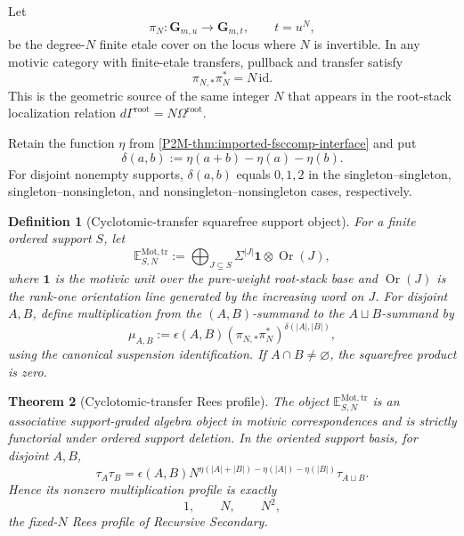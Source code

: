 \documentclass[11pt]{article}
\newtheorem{theorem}{Theorem}[section]
\newtheorem{definition}[theorem]{Definition}
\theoremstyle{remark}
\newcommand{\Mot}{\mathrm{Mot}}
\newcommand{\rootc}{\mathrm{root}}
\begin{document}
Let
\[
 \pi_N:\mathbf G_{m,u}\longrightarrow\mathbf G_{m,t},
 \qquad t=u^N,
\]
be the degree-\(N\) finite etale cover on the locus where \(N\) is invertible.
In any motivic category with finite-etale transfers, pullback and transfer
satisfy
\[
 \boxed{\pi_{N,*}\pi_N^*=N\,\mathrm{id}.}
\]
This is the geometric source of the same integer \(N\) that appears in the
root-stack localization relation \(d\Gamma^{\rootc}=N\Omega^{\rootc}\).

Retain the function \(\eta\) from
\cref{P2M-thm:imported-fsccomp-interface} and put
\[
 \delta(a,b):=\eta(a+b)-\eta(a)-\eta(b).
\]
For disjoint nonempty supports, \(\delta(a,b)\) equals \(0,1,2\) in the
singleton--singleton, singleton--nonsingleton, and
nonsingleton--nonsingleton cases, respectively.

\begin{definition}[Cyclotomic-transfer squarefree support object]
\label{P2M-def:transfer-rees-object}
For a finite ordered support \(S\), let
\[
 \mathbb E^{\Mot,\mathrm{tr}}_{S,N}
 :=\bigoplus_{J\subseteq S}
    \Sigma^{|J|}\mathbf 1\otimes\operatorname{Or}(J),
\]
where \(\mathbf1\) is the motivic unit over the pure-weight root-stack base
and \(\operatorname{Or}(J)\) is the rank-one orientation line generated by
the increasing word on \(J\).  For disjoint \(A,B\), define multiplication
from the \((A,B)\)-summand to the \(A\sqcup B\)-summand by
\[
 \boxed{
 \mu_{A,B}
 :=\epsilon(A,B)
   (\pi_{N,*}\pi_N^*)^{\delta(|A|,|B|)},}
\]
using the canonical suspension identification.  If \(A\cap B\ne\varnothing\),
the squarefree product is zero.
\end{definition}

\begin{theorem}[Cyclotomic-transfer Rees profile]
\label{P2M-thm:transfer-rees-profile}
The object \(\mathbb E^{\Mot,\mathrm{tr}}_{S,N}\) is an associative
support-graded algebra object in motivic correspondences and is strictly
functorial under ordered support deletion.  In the oriented support basis,
for disjoint \(A,B\),
\[
 \boxed{
 \tau_A\tau_B
 =\epsilon(A,B)
   N^{\eta(|A|+|B|)-\eta(|A|)-\eta(|B|)}
   \tau_{A\sqcup B}.}
\]
Hence its nonzero multiplication profile is exactly
\[
 \boxed{1,\qquad N,\qquad N^2,}
\]
the fixed-\(N\) Rees profile of Recursive Secondary.
\end{theorem}
\end{document}
